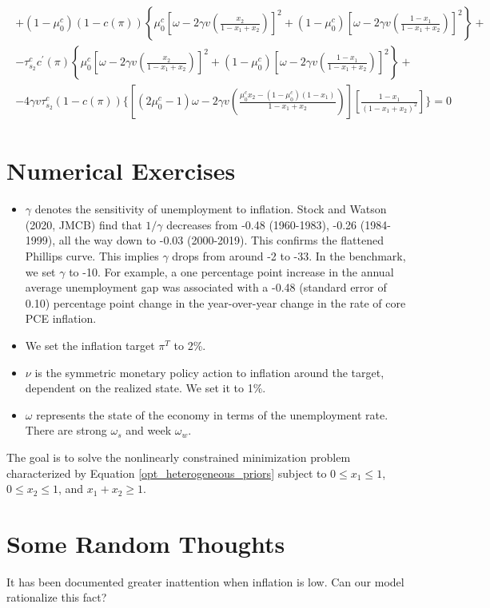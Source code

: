 \documentclass[12pt,a4paper]{article}
\begin{document}
\begin{small}
\begin{eqnarray}
\begin{split}
        +(1-\mu_0^c)(1-c(\pi))\left\{\mu_0^c\left[\omega-2\gamma v\left(\frac{x_2}{1-x_1+x_2}\right)\right]^2+(1-\mu_0^c)\left[\omega-2\gamma v\left(\frac{1-x_1}{1-x_1+x_2}\right)\right]^2\right\}+\\
        -\tau_{s_2}^cc^\prime(\pi)\left\{\mu_0^c\left[\omega-2\gamma v\left(\frac{x_2}{1-x_1+x_2}\right)\right]^2+(1-\mu_0^c)\left[\omega-2\gamma v\left(\frac{1-x_1}{1-x_1+x_2}\right)\right]^2\right\}+\\
        -4\gamma v\tau_{s_2}^c(1-c(\pi))\Bigg\{\left[(2\mu_0^c-1)\omega-2\gamma v\left(\frac{\mu_0^cx_2-(1-\mu_0^c)(1-x_1)}{1-x_1+x_2}\right)\right]\left[\frac{1-x_1}{(1-x_1+x_2)^2}\right]\Bigg\}=0
    \end{split}
\end{eqnarray}
\end{small}

\section{Numerical Exercises}
\begin{itemize}
    \item $\gamma$ denotes the sensitivity of unemployment to inflation. Stock and Watson (2020, JMCB) find that $1/\gamma$ decreases from -0.48 (1960-1983), -0.26 (1984-1999), all the way down to -0.03 (2000-2019). This confirms the flattened Phillips curve. This implies $\gamma$ drops from around -2 to -33. In the benchmark, we set $\gamma$ to -10. For example, a one percentage point increase in the annual average unemployment gap was associated with a -0.48 (standard error of 0.10) percentage point change in the year-over-year change in the rate of core PCE inflation.
    \item We set the inflation target $\pi^T$ to 2\%. 
    \item $\nu$ is the symmetric monetary policy action to inflation around the target, dependent on the realized state. We set it to 1\%.
    \item $\omega$ represents the state of the economy in terms of the unemployment rate. There are strong $\omega_s$ and week $\omega_w$.
\end{itemize}

The goal is to solve the nonlinearly constrained minimization problem characterized by Equation \eqref{opt_heterogeneous_priors} subject to $0 \leq x_1 \leq 1$, $0 \leq x_2 \leq 1$, and $x_1+x_2 \geq 1$.

\section{Some Random Thoughts}

It has been documented greater inattention when inflation is low. Can our model rationalize this fact? %

\newpage


\end{document}
